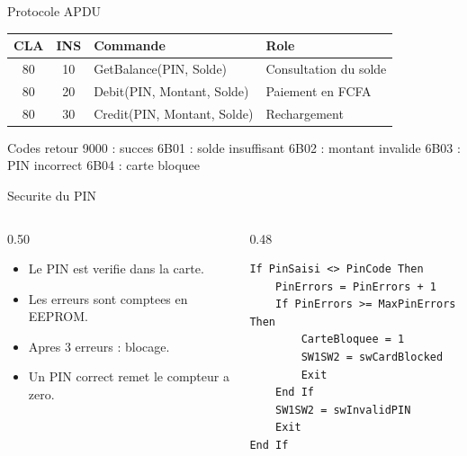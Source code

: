\documentclass[aspectratio=169,11pt]{beamer}
\begin{document}
\begin{frame}{Protocole APDU}
  \begin{center}
    \renewcommand{\arraystretch}{1.25}
    \begin{tabular}{c c p{} p{}}
      \textbf{CLA} & \textbf{INS} & \textbf{Commande} & \textbf{Role} \\
      \hline
      80 & 10 & GetBalance(PIN, Solde) & Consultation du solde \\
      80 & 20 & Debit(PIN, Montant, Solde) & Paiement en FCFA \\
      80 & 30 & Credit(PIN, Montant, Solde) & Rechargement \\
    \end{tabular}
  \end{center}
  \vspace{0.4cm}
  \begin{block}{Codes retour}
    9000 : succes \quad
    6B01 : solde insuffisant \quad
    6B02 : montant invalide \quad
    6B03 : PIN incorrect \quad
    6B04 : carte bloquee
  \end{block}
\end{frame}

\begin{frame}[fragile]{Securite du PIN}
  \begin{columns}[T]
    \begin{column}{0.50\textwidth}
      \begin{itemize}
        \item Le PIN est verifie dans la carte.
        \item Les erreurs sont comptees en EEPROM.
        \item Apres 3 erreurs : blocage.
        \item Un PIN correct remet le compteur a zero.
      \end{itemize}
    \end{column}
    \begin{column}{0.48\textwidth}
\begin{lstlisting}
If PinSaisi <> PinCode Then
    PinErrors = PinErrors + 1
    If PinErrors >= MaxPinErrors Then
        CarteBloquee = 1
        SW1SW2 = swCardBlocked
        Exit
    End If
    SW1SW2 = swInvalidPIN
    Exit
End If
\end{lstlisting}
    \end{column}
  \end{columns}
\end{frame}
\end{document}
